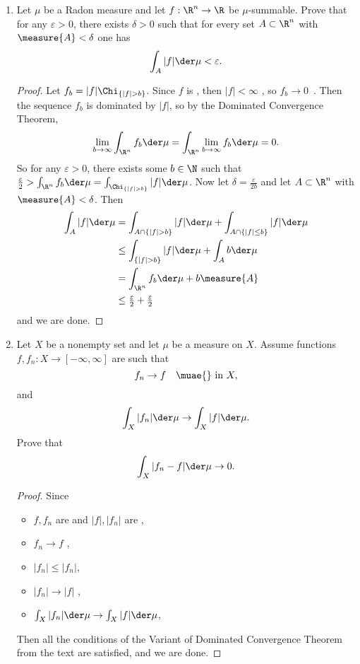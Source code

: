 \documentclass[12pt,letterpaper]{article}
\begin{document}
\begin{enumerate}
\pagebreak
\item Let $\mu$ be a Radon measure and let $f:\R^n\to\R$ be $\mu$-summable. Prove that for any $\varepsilon>0$, there exists $\delta>0$ such that for every \mumeasurable{} set $A\subset\R^n$ with $\measure{A}<\delta$ one has 
$$ \int_A |f|\der\mu < \varepsilon.$$
\begin{proof}
Let $f_b=|f|\Chi_{\{|f|>b\}}$. Since $f$ is \musummable{}, then $|f|<\infty$ \muae{}, so $f_b\to0$ \muae{}\,. Then the sequence $f_b$ is dominated by $|f|$, so by the Dominated Convergence Theorem, 
$$\lim_{b\to\infty} \int_{\R^n} f_b \der\mu = \int_{\R^n} \lim_{b\to\infty}f_b \der\mu = 0.$$
So for any $\varepsilon>0$, there exists some $b\in\N$ such that $\frac{\varepsilon}{2}>\int_{\R^n} f_b \der\mu = \int_{\Chi_{\{|f|>b\}}} |f| \der\mu $. Now let $\delta=\frac{\varepsilon}{2b}$ and let $A\subset\R^n$ with $\measure{A}<\delta$. Then 
\begin{align*}
	\int_A |f| \der\mu &= \int_{A\cap{\{|f|>b\}}} |f| \der\mu + \int_{A\cap{\{|f|\leq b\}}} |f| \der\mu\\
	&\leq \int_{{\{|f|>b\}}} |f| \der\mu + \int_{A} b \der\mu\\
	&= \int_{\R^n} f_b \der\mu + b\measure{A}\\
	&\leq \tfrac{\varepsilon}{2	} + \tfrac{\varepsilon}{2}\\
\end{align*}
and we are done.
\end{proof}

\pagebreak
\item Let $X$ be a nonempty set and let $\mu$ be a measure on $X$. Assume \musummable{} functions $f,f_n:X\to[-\infty,\infty]$ are such that 
$$f_n\to f \quad \text{\muae{} in } X,$$
and 
$$\int_X |f_n| \der\mu \to \int_X |f| \der\mu .$$
Prove that 
$$\int_X |f_n-f|\der\mu \to 0.$$
\begin{proof}
Since 
\begin{itemize}
	\item $f,f_n$ are \mumeasurable{} and $|f|,|f_n|$ are \musummable{},  
	\item $f_n\to f$ \muae{},
	\item $|f_n|\leq |f_n|$,
	\item $|f_n|\to |f|$ \muae{},
	\item $\int_X |f_n| \der\mu \to \int_X |f| \der\mu$, 	
\end{itemize}
Then all the conditions of the Variant of Dominated Convergence Theorem from the text are satisfied, and we are done. 
\end{proof}


\end{enumerate}
\end{document}

